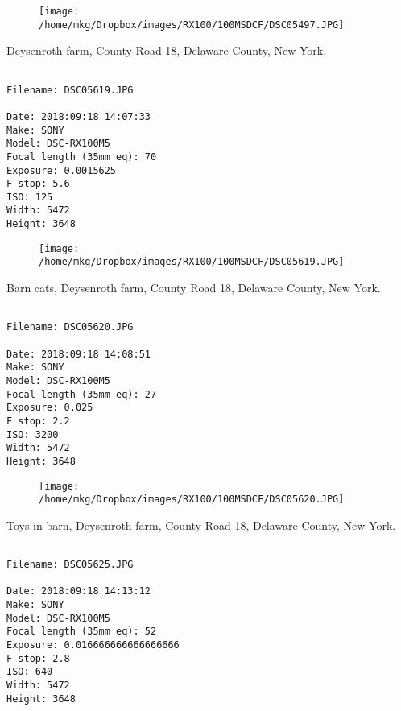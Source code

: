 \begin{figure}
\texttt{[image: /home/mkg/Dropbox/images/RX100/100MSDCF/DSC05497.JPG]}
\end{figure}
    
\clearpage
\onecolumn
\noindent Deysenroth farm, County Road 18, Delaware County, New York.
\noindent
\begin{lstlisting}

Filename: DSC05619.JPG

Date: 2018:09:18 14:07:33
Make: SONY
Model: DSC-RX100M5
Focal length (35mm eq): 70
Exposure: 0.0015625
F stop: 5.6
ISO: 125
Width: 5472
Height: 3648
\end{lstlisting}
\clearpage

\begin{figure}
\texttt{[image: /home/mkg/Dropbox/images/RX100/100MSDCF/DSC05619.JPG]}
\end{figure}
    
\clearpage
\onecolumn
\noindent Barn cats, Deysenroth farm, County Road 18, Delaware County, New York.
\noindent
\begin{lstlisting}

Filename: DSC05620.JPG

Date: 2018:09:18 14:08:51
Make: SONY
Model: DSC-RX100M5
Focal length (35mm eq): 27
Exposure: 0.025
F stop: 2.2
ISO: 3200
Width: 5472
Height: 3648
\end{lstlisting}
\clearpage

\begin{figure}
\texttt{[image: /home/mkg/Dropbox/images/RX100/100MSDCF/DSC05620.JPG]}
\end{figure}
    
\clearpage
\onecolumn
\noindent Toys in barn, Deysenroth farm, County Road 18, Delaware County, New York.
\noindent
\begin{lstlisting}

Filename: DSC05625.JPG

Date: 2018:09:18 14:13:12
Make: SONY
Model: DSC-RX100M5
Focal length (35mm eq): 52
Exposure: 0.016666666666666666
F stop: 2.8
ISO: 640
Width: 5472
Height: 3648
\end{lstlisting}
\clearpage

